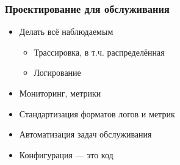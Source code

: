 \documentclass{../../slides-style}
\begin{document}
    \begin{frame}
        \frametitle{Проектирование для обслуживания}
        \begin{itemize}
            \item Делать всё наблюдаемым
            \begin{itemize}
                \item Трассировка, в т.ч. распределённая
                \item Логирование 
            \end{itemize}
            \item Мониторинг, метрики
            \item Стандартизация форматов логов и метрик
            \item Автоматизация задач обслуживания
            \item Конфигурация --- это код
        \end{itemize}
    \end{frame}
\end{document}
